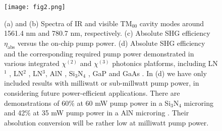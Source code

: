 \documentclass{WileyMSP-template}
\begin{document}
\begin{figure}
  \texttt{[image: fig2.png]}
  \caption{ (a) and (b) Spectra of IR and visible TM$_{00}$ cavity modes around 1561.4 nm and 780.7 nm, respectively. (c) Absolute SHG efficiency $\eta_\mathrm{abs}$ versus the on-chip pump power. (d) Absolute SHG efficiency and the corresponding required pump power demonstrated in various integrated $\chi^{(2)}$ and $\chi^{(3)}$ photonics platforms, including  LN$^1$ \cite{chen2019ultra}, LN$^2$ \cite{lu2019periodically}, LN$^3$\cite{ma2020ultrabright}, AlN \cite{bruch2019chip}, Si$_3$N$_4$ \cite{lu2019efficient}, GaP \cite{logan2018400} and GaAs \cite{chang2019strong}.
 In (d) we have only included results with milliwatt or sub-millwatt pump power, in considering future power-efficient applications. There are demonstrations of 60$\%$ at 60 mW pump power in a Si$_3$N$_4$ microring  \cite{li2016efficient} and 42$\%$ at 35 mW pump power in a AlN microring \cite{wang2020efficient}. Their absolution conversion will be rather low at milliwatt pump power.}
  \label{fig2}
\end{figure}
\newpage

\end{document}
